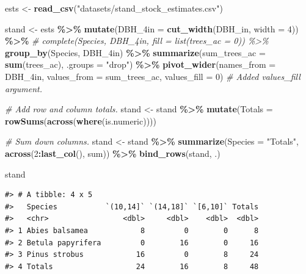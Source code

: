 \documentclass[
  11pt,
]{krantz}
\newenvironment{Shaded}{\begin{snugshade}}{\end{snugshade}}
\newcommand{\CommentTok}[1]{\textcolor[rgb]{0.56,0.35,0.01}{\textit{#1}}}
\newcommand{\DataTypeTok}[1]{\textcolor[rgb]{0.13,0.29,0.53}{#1}}
\newcommand{\DecValTok}[1]{\textcolor[rgb]{0.00,0.00,0.81}{#1}}
\newcommand{\KeywordTok}[1]{\textcolor[rgb]{0.13,0.29,0.53}{\textbf{#1}}}
\newcommand{\NormalTok}[1]{#1}
\newcommand{\OperatorTok}[1]{\textcolor[rgb]{0.81,0.36,0.00}{\textbf{#1}}}
\newcommand{\StringTok}[1]{\textcolor[rgb]{0.31,0.60,0.02}{#1}}
\theoremstyle{definition}
\theoremstyle{definition}
\theoremstyle{definition}
\theoremstyle{definition}
\theoremstyle{remark}
\begin{document}
\begin{Shaded}
\begin{Highlighting}[]
\NormalTok{ests \textless{}{-}}\StringTok{ }\KeywordTok{read\_csv}\NormalTok{(}\StringTok{"datasets/stand\_stock\_estimates.csv"}\NormalTok{)}

\NormalTok{stand \textless{}{-}}\StringTok{ }\NormalTok{ests }\OperatorTok{\%\textgreater{}\%}\StringTok{ }\KeywordTok{mutate}\NormalTok{(}\DataTypeTok{DBH\_4in =} \KeywordTok{cut\_width}\NormalTok{(DBH\_in, }\DataTypeTok{width =} \DecValTok{4}\NormalTok{)) }\OperatorTok{\%\textgreater{}\%}
\StringTok{  }\CommentTok{\# complete(Species, DBH\_4in, fill = list(trees\_ac = 0)) \%\textgreater{}\%}
\StringTok{  }\KeywordTok{group\_by}\NormalTok{(Species, DBH\_4in) }\OperatorTok{\%\textgreater{}\%}
\StringTok{  }\KeywordTok{summarize}\NormalTok{(}\DataTypeTok{sum\_trees\_ac =} \KeywordTok{sum}\NormalTok{(trees\_ac), }\DataTypeTok{.groups =} \StringTok{"drop"}\NormalTok{) }\OperatorTok{\%\textgreater{}\%}
\StringTok{  }\KeywordTok{pivot\_wider}\NormalTok{(}\DataTypeTok{names\_from =}\NormalTok{ DBH\_4in, }\DataTypeTok{values\_from =}\NormalTok{ sum\_trees\_ac,}
            \DataTypeTok{values\_fill =} \DecValTok{0}\NormalTok{) }\CommentTok{\# Added values\_fill argument.}

\CommentTok{\# Add row and column totals.}
\NormalTok{stand \textless{}{-}}\StringTok{ }\NormalTok{stand }\OperatorTok{\%\textgreater{}\%}
\StringTok{  }\KeywordTok{mutate}\NormalTok{(}\DataTypeTok{Totals =} \KeywordTok{rowSums}\NormalTok{(}\KeywordTok{across}\NormalTok{(}\KeywordTok{where}\NormalTok{(is.numeric))))}

\CommentTok{\# Sum down columns.  }
\NormalTok{stand \textless{}{-}}\StringTok{ }\NormalTok{stand }\OperatorTok{\%\textgreater{}\%}\StringTok{  }
\StringTok{  }\KeywordTok{summarize}\NormalTok{(}\DataTypeTok{Species =} \StringTok{"Totals"}\NormalTok{, }\KeywordTok{across}\NormalTok{(}\DecValTok{2}\OperatorTok{:}\KeywordTok{last\_col}\NormalTok{(), sum)) }\OperatorTok{\%\textgreater{}\%}
\StringTok{  }\KeywordTok{bind\_rows}\NormalTok{(stand, .)}

\NormalTok{stand}
\end{Highlighting}
\end{Shaded}

\begin{verbatim}
#> # A tibble: 4 x 5
#>   Species           `(10,14]` `(14,18]` `[6,10]` Totals
#>   <chr>                 <dbl>     <dbl>    <dbl>  <dbl>
#> 1 Abies balsamea            8         0        0      8
#> 2 Betula papyrifera         0        16        0     16
#> 3 Pinus strobus            16         0        8     24
#> 4 Totals                   24        16        8     48
\end{verbatim}
\end{document}
